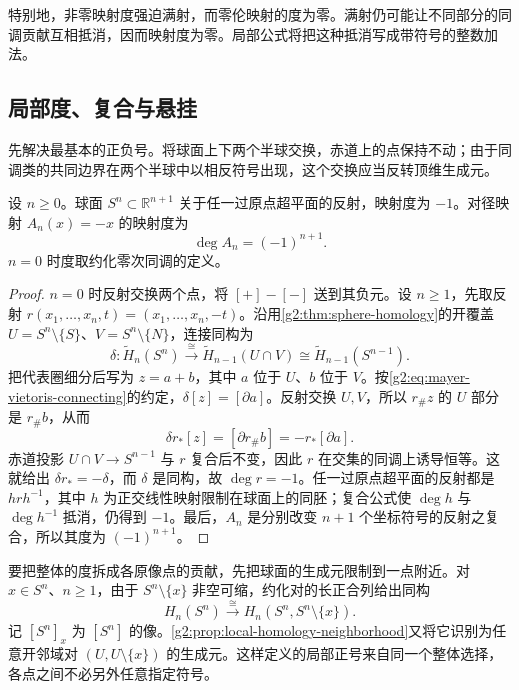 特别地，非零映射度强迫满射，而零伦映射的度为零。满射仍可能让不同部分的同调贡献互相抵消，因而映射度为零。局部公式将把这种抵消写成带符号的整数加法。

\subsection{局部度、复合与悬挂}
\label{g2:subsec:0302:02}

先解决最基本的正负号。将球面上下两个半球交换，赤道上的点保持不动；由于同调类的共同边界在两个半球中以相反符号出现，这个交换应当反转顶维生成元。

\begin{proposition}\label{g2:prop:reflection-antipodal-degree}
	设 \(n\ge0\)。球面 \(S^n\subset\mathbb R^{n+1}\) 关于任一过原点超平面的反射，映射度为 \(-1\)。对径映射 \(A_n(x)=-x\) 的映射度为
	\[
		\deg A_n=(-1)^{n+1}.
	\]
	\(n=0\) 时度取约化零次同调的定义。
\end{proposition}
\begin{proof}
	\(n=0\) 时反射交换两个点，将 \([+]-[-]\) 送到其负元。设 \(n\ge1\)，先取反射 \(r(x_1,\ldots,x_n,t)=(x_1,\ldots,x_n,-t)\)。沿用\cref{g2:thm:sphere-homology}的开覆盖 \(U=S^n\setminus\{S\}\)、\(V=S^n\setminus\{N\}\)，连接同构为
	\[
		\delta:\widetilde H_n(S^n)\xrightarrow{\cong}
		\widetilde H_{n-1}(U\cap V)\cong\widetilde H_{n-1}(S^{n-1}).
	\]
	把代表圈细分后写为 \(z=a+b\)，其中 \(a\) 位于 \(U\)、\(b\) 位于 \(V\)。按\cref{g2:eq:mayer-vietoris-connecting}的约定，\(\delta[z]=[\partial a]\)。反射交换 \(U,V\)，所以 \(r_\#z\) 的 \(U\) 部分是 \(r_\#b\)，从而
	\[
		\delta r_*[z]=[\partial r_\#b]
		=-r_*[\partial a].
	\]
	赤道投影 \(U\cap V\rightarrow S^{n-1}\) 与 \(r\) 复合后不变，因此 \(r\) 在交集的同调上诱导恒等。这就给出 \(\delta r_*=-\delta\)，而 \(\delta\) 是同构，故 \(\deg r=-1\)。任一过原点超平面的反射都是 \(h r h^{-1}\)，其中 \(h\) 为正交线性映射限制在球面上的同胚；复合公式使 \(\deg h\) 与 \(\deg h^{-1}\) 抵消，仍得到 \(-1\)。最后，\(A_n\) 是分别改变 \(n+1\) 个坐标符号的反射之复合，所以其度为 \((-1)^{n+1}\)。
\end{proof}

要把整体的度拆成各原像点的贡献，先把球面的生成元限制到一点附近。对 \(x\in S^n\)、\(n\ge1\)，由于 \(S^n\setminus\{x\}\) 非空可缩，约化对的长正合列给出同构
\[
	H_n(S^n)\xrightarrow{\cong}H_n(S^n,S^n\setminus\{x\}).
\]
记 \([S^n]_x\) 为 \([S^n]\) 的像。\cref{g2:prop:local-homology-neighborhood}又将它识别为任意开邻域对 \((U,U\setminus\{x\})\) 的生成元。这样定义的局部正号来自同一个整体选择，各点之间不必另外任意指定符号。

